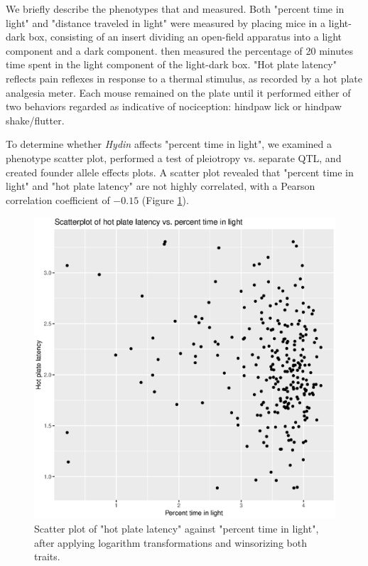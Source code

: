 \documentclass[12pt,twoside, lineno]{gsajnl}
\begin{document}
We briefly describe the phenotypes that \citet{logan2013high} and \citet{recla2014precise} measured. Both "percent time in light" and "distance traveled in light" were measured by placing mice in a light-dark box, consisting of an insert dividing an open-field apparatus into a light component and a dark component. \citet{logan2013high} then measured the percentage of 20 minutes time spent in the light component of the light-dark box. "Hot plate latency" reflects pain reflexes in response to a thermal stimulus, as recorded by a hot plate analgesia meter. Each mouse remained on the plate until it performed either of two behaviors regarded as indicative of nociception: hindpaw lick or hindpaw shake/flutter.




To determine whether \textit{Hydin} affects "percent time in light", we examined a phenotype scatter plot, performed a test of pleiotropy vs. separate QTL, and created founder allele effects plots. A scatter plot revealed that "percent time in light" and "hot plate latency" are not highly correlated, with a Pearson correlation coefficient of $-0.15$ (Figure \ref{fig:scatter}). 

\begin{figure}
\includegraphics[width = \textwidth]{2018-11-19-scatter.eps}
\caption{Scatter plot of "hot plate latency" against "percent time in light", after applying logarithm transformations and winsorizing both traits.}
\label{fig:scatter}
\end{figure}
\end{document}
